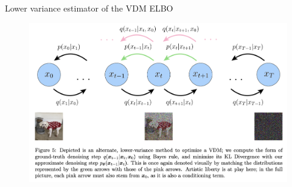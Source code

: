 \begin{frame}{Lower variance estimator of the VDM ELBO}
    \begin{figure}
        \centering
        \includegraphics[width=0.8\linewidth]{images/vdm_fig5.png}
    \end{figure}
\end{frame}